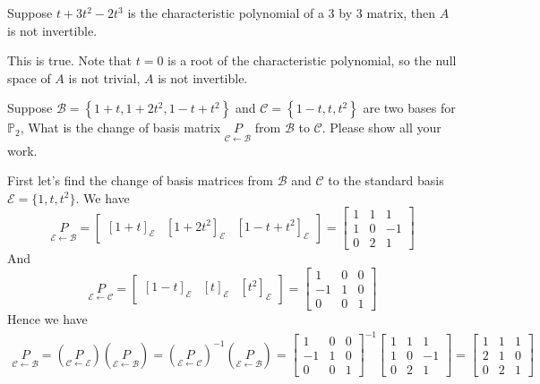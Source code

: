 \documentclass[a4paper,10pt]{article}
\begin{document}
\begin{problem}
Suppose $t+3t^2-2t^3$ is the characteristic polynomial of a 3 by 3 matrix, then $A$ is not invertible.
\end{problem}

\begin{solution}
This is true. Note that $t=0$ is a root of the characteristic polynomial, so the null space of $A$ is not trivial, $A$ is not invertible.
\end{solution}

\begin{problem}
Suppose $\mathcal B=\left\{1+t,1+2t^2,1-t+t^2\right\}$ and $\mathcal C=\left\{1-t,t,t^2\right\}$ are two bases for $\mathbb P_2$, What is the change of basis matrix $\underset{\mathcal C\leftarrow\mathcal B}{P}$ from $\mathcal B$ to $\mathcal C$. Please show all your work.
\end{problem}

\begin{solution}
First let's find the change of basis matrices from $\mathcal B$ and $\mathcal C$ to the standard basis $\mathcal E=\{1,t,t^2\}$. We have
\[
\underset{\mathcal E\leftarrow\mathcal B}{P}=\begin{bmatrix}
[1+t]_{\mathcal E}&[1+2t^2]_{\mathcal E}&[1-t+t^2]_{\mathcal E}
\end{bmatrix}=\begin{bmatrix}
1&1&1\\
1&0&-1\\
0&2&1
\end{bmatrix}
\]
And
\[
\underset{\mathcal E\leftarrow\mathcal C}{P}=\begin{bmatrix}
[1-t]_{\mathcal E}&[t]_{\mathcal E}&[t^2]_{\mathcal E}
\end{bmatrix}=\begin{bmatrix}
1&0&0\\
-1&1&0\\
0&0&1
\end{bmatrix}
\]
Hence we have
\begin{align*}
\underset{\mathcal C\leftarrow\mathcal B}{P}=\left(\underset{\mathcal C\leftarrow\mathcal E}{P}\right)\left(\underset{\mathcal E\leftarrow\mathcal B}{P}\right)=\left(\underset{\mathcal E\leftarrow\mathcal C}{P}\right)^{-1}\left(\underset{\mathcal E\leftarrow\mathcal B}{P}\right)=\begin{bmatrix}
1&0&0\\
-1&1&0\\
0&0&1
\end{bmatrix}^{-1}\begin{bmatrix}
1&1&1\\
1&0&-1\\
0&2&1
\end{bmatrix}=\begin{bmatrix}
1       &       1  &            1       \\
2        &      1 &             0       \\
0         &     2&              1 
\end{bmatrix}
\end{align*}
\end{solution}
\end{document}
